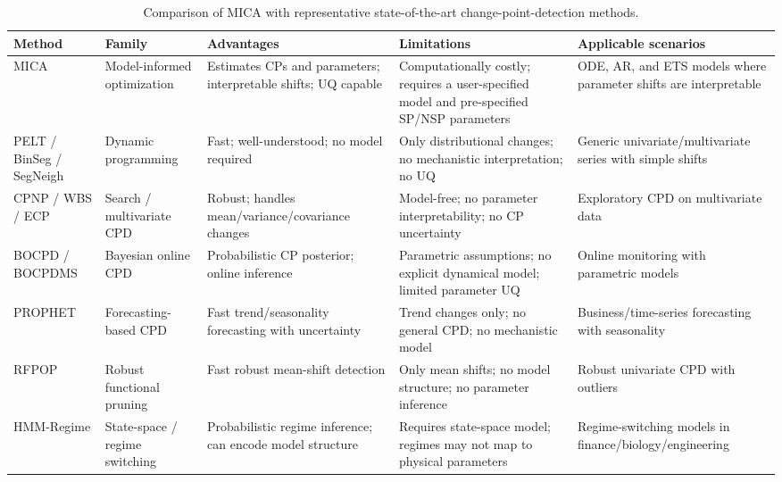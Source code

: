 \begin{table}[!htbp]
\micaaddcolor
\centering
\footnotesize
\caption{Comparison of MICA with representative state-of-the-art change-point-detection methods.}
\label{tab:cpd-comparison}
\begin{tabularx}{\columnwidth}{>{\RaggedRight\arraybackslash}p{1.7cm} >{\RaggedRight\arraybackslash}p{2.2cm} X X X}
\toprule
\textbf{Method} & \textbf{Family} & \textbf{Advantages} & \textbf{Limitations} & \textbf{Applicable scenarios} \\
\midrule
MICA & Model-informed optimization & Estimates CPs and parameters; interpretable shifts; UQ capable & Computationally costly; requires a user-specified model and pre-specified SP/NSP parameters & ODE, AR, and ETS models where parameter shifts are interpretable \\
\midrule
PELT / BinSeg / SegNeigh & Dynamic programming & Fast; well-understood; no model required & Only distributional changes; no mechanistic interpretation; no UQ & Generic univariate/multivariate series with simple shifts \\
\midrule
CPNP / WBS / ECP & Search / multivariate CPD & Robust; handles mean/variance/covariance changes & Model-free; no parameter interpretability; no CP uncertainty & Exploratory CPD on multivariate data \\
\midrule
BOCPD / BOCPDMS & Bayesian online CPD & Probabilistic CP posterior; online inference & Parametric assumptions; no explicit dynamical model; limited parameter UQ & Online monitoring with parametric models \\
\midrule
PROPHET & Forecasting-based CPD & Fast trend/seasonality forecasting with uncertainty & Trend changes only; no general CPD; no mechanistic model & Business/time-series forecasting with seasonality \\
\midrule
RFPOP & Robust functional pruning & Fast robust mean-shift detection & Only mean shifts; no model structure; no parameter inference & Robust univariate CPD with outliers \\
\midrule
HMM-Regime & State-space / regime switching & Probabilistic regime inference; can encode model structure & Requires state-space model; regimes may not map to physical parameters & Regime-switching models in finance/biology/engineering \\
\bottomrule
\end{tabularx}
\end{table}
